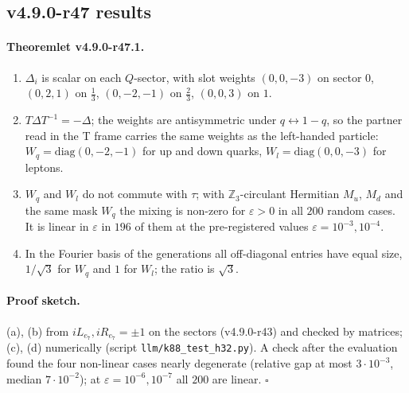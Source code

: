 \subsection*{v4.9.0-r47 results}
\label{subsec:v490-r47-results}

\paragraph{Theoremlet v4.9.0-r47.1.}
\begin{enumerate}[leftmargin=2em]
\item[(a)] \(\Delta_i\) is scalar on each \(Q\)-sector, with slot weights \((0,0,-3)\) on sector \(0\), \((0,2,1)\) on \(\tfrac13\), \((0,-2,-1)\) on
\(\tfrac23\), \((0,0,3)\) on \(1\).
\item[(b)] \(T\Delta T^{-1}=-\Delta\); the weights are antisymmetric under \(q\leftrightarrow1-q\), so the partner read in the T frame carries the same
weights as the left-handed particle: \(W_q=\mathrm{diag}(0,-2,-1)\) for up and down quarks, \(W_l=\mathrm{diag}(0,0,-3)\) for leptons.
\item[(c)] \(W_q\) and \(W_l\) do not commute with \(\tau\); with \(\mathbb Z_3\)-circulant Hermitian \(M_u\), \(M_d\) and the same mask \(W_q\) the mixing
is non-zero for \(\varepsilon>0\) in all \(200\) random cases.  It is linear in \(\varepsilon\) in \(196\) of them at the pre-registered values
\(\varepsilon=10^{-3},10^{-4}\).
\item[(d)] In the Fourier basis of the generations all off-diagonal entries have equal size, \(1/\sqrt3\) for \(W_q\) and \(1\) for \(W_l\); the
ratio is \(\sqrt3\).
\end{enumerate}

\paragraph{Proof sketch.}
(a), (b) from \(iL_{e_7},iR_{e_7}=\pm1\) on the sectors (v4.9.0-r43) and checked by matrices; (c), (d) numerically (script
\texttt{llm/k88\_test\_h32.py}).  A check after the evaluation found the four non-linear cases nearly degenerate (relative gap at most
\(3\cdot10^{-3}\), median \(7\cdot10^{-2}\)); at \(\varepsilon=10^{-6},10^{-7}\) all \(200\) are linear.  \(\square\)

